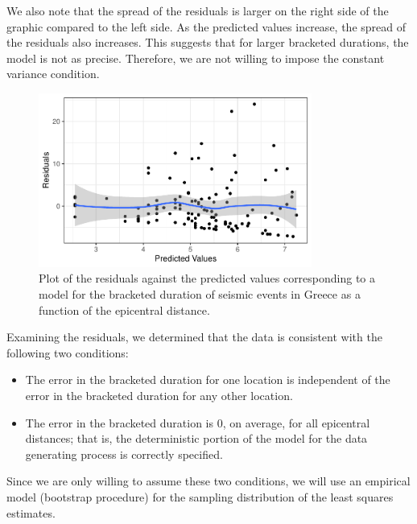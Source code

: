 \documentclass[
  letterpaper,
  DIV=11,
  numbers=noendperiod]{scrreprt}
\providecommand{\tightlist}{%
  \setlength{\itemsep}{0pt}\setlength{\parskip}{0pt}}\usepackage{longtable,booktabs,array}
\theoremstyle{definition}
\theoremstyle{definition}
\theoremstyle{plain}
\theoremstyle{remark}
\begin{document}
We also note that the spread of the residuals is larger on the right
side of the graphic compared to the left side. As the predicted values
increase, the spread of the residuals also increases. This suggests that
for larger bracketed durations, the model is not as precise. Therefore,
we are not willing to impose the constant variance condition.

\begin{figure}

{\centering \includegraphics[width=0.8\textwidth,height=\textheight]{./images/fig-regrecap-mean0-1.pdf}

}

\caption{\label{fig-regrecap-mean0}Plot of the residuals against the
predicted values corresponding to a model for the bracketed duration of
seismic events in Greece as a function of the epicentral distance.}

\end{figure}

Examining the residuals, we determined that the data is consistent with
the following two conditions:

\begin{itemize}
\tightlist
\item
  The error in the bracketed duration for one location is independent of
  the error in the bracketed duration for any other location.
\item
  The error in the bracketed duration is 0, on average, for all
  epicentral distances; that is, the deterministic portion of the model
  for the data generating process is correctly specified.
\end{itemize}

Since we are only willing to assume these two conditions, we will use an
empirical model (bootstrap procedure) for the sampling distribution of
the least squares estimates.
\end{document}
